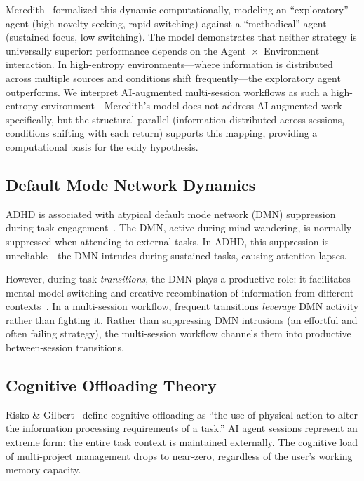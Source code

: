 \documentclass[sigconf,nonacm]{acmart}
\begin{document}
Meredith~\cite{meredith2025} formalized this dynamic computationally, modeling an ``exploratory'' agent (high novelty-seeking, rapid switching) against a ``methodical'' agent (sustained focus, low switching). The model demonstrates that neither strategy is universally superior: performance depends on the Agent~$\times$~Environment interaction. In high-entropy environments---where information is distributed across multiple sources and conditions shift frequently---the exploratory agent outperforms. We interpret AI-augmented multi-session workflows as such a high-entropy environment---Meredith's model does not address AI-augmented work specifically, but the structural parallel (information distributed across sessions, conditions shifting with each return) supports this mapping, providing a computational basis for the eddy hypothesis.

\subsection{Default Mode Network Dynamics}

ADHD is associated with atypical default mode network (DMN) suppression during task engagement~\cite{castellanos2016}. The DMN, active during mind-wandering, is normally suppressed when attending to external tasks. In ADHD, this suppression is unreliable---the DMN intrudes during sustained tasks, causing attention lapses.

However, during task \emph{transitions}, the DMN plays a productive role: it facilitates mental model switching and creative recombination of information from different contexts~\cite{christoff2016}. In a multi-session workflow, frequent transitions \emph{leverage} DMN activity rather than fighting it. Rather than suppressing DMN intrusions (an effortful and often failing strategy), the multi-session workflow channels them into productive between-session transitions.

\subsection{Cognitive Offloading Theory}

Risko \& Gilbert~\cite{risko2016} define cognitive offloading as ``the use of physical action to alter the information processing requirements of a task.'' AI agent sessions represent an extreme form: the entire task context is maintained externally. The cognitive load of multi-project management drops to near-zero, regardless of the user's working memory capacity.
\end{document}
